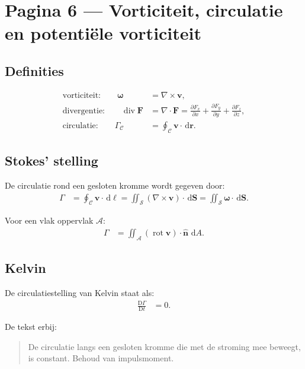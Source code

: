 \documentclass[11pt]{article}
\newcommand{\dd}{\,\mathrm{d}}
\newcommand{\D}{\mathrm{D}}
\newcommand{\divergence}{\operatorname{div}}
\newcommand{\rot}{\operatorname{rot}}
\newcommand{\vect}[1]{\mathbf{#1}}
\begin{document}
\section*{Pagina 6 --- Vorticiteit, circulatie en potentiële vorticiteit}

\subsection*{Definities}

\begin{align*}
\text{vorticiteit:}\qquad
\bm{\omega}
  &= \nabla\times\vect{v},
\\
\text{divergentie:}\qquad
\divergence\vect{F}
  &= \nabla\cdot\vect{F}
   =
   \frac{\partial F_x}{\partial x}
   +\frac{\partial F_y}{\partial y}
   +\frac{\partial F_z}{\partial z},
\\
\text{circulatie:}\qquad
\Gamma_{\mathcal{C}}
  &=
  \oint_{\mathcal{C}}\vect{v}\cdot\dd\vect{r}.
\end{align*}

\subsection*{Stokes' stelling}

De circulatie rond een gesloten kromme wordt gegeven door:
\begin{align*}
\Gamma
  &=
  \oint_{\mathcal{C}}\vect{v}\cdot\dd\vect{\ell}
   =
  \iint_{\mathcal{S}}
  \left(\nabla\times\vect{v}\right)\cdot\dd\vect{S}
   =
  \iint_{\mathcal{S}}
  \bm{\omega}\cdot\dd\vect{S}.
\end{align*}

Voor een vlak oppervlak $\mathcal{A}$:
\begin{align*}
\Gamma
  &=
  \iint_{\mathcal{A}}
  \left(\rot \vect{v}\right)\cdot\hat{\vect{n}}\,\dd A.
\end{align*}

\subsection*{Kelvin}

De circulatiestelling van Kelvin staat als:
\begin{align*}
\frac{\D\Gamma}{\D t}
  &=0.
\end{align*}

De tekst erbij:
\begin{quote}
De circulatie langs een gesloten kromme die met de stroming mee beweegt, is constant. Behoud van impulsmoment.
\end{quote}
\end{document}
